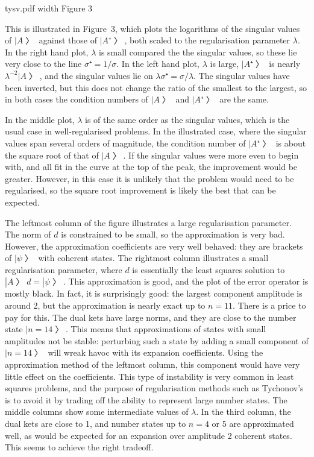 \midinsert \XeTeXpicfile tysv.pdf width \hsize
Figure 3 \endinsert

This is illustrated in Figure~3, which plots the logarithms of the singular values of $|A〉$ against those of $|A⁺〉$, both scaled to the regularisation parameter $λ$.  In the right hand plot, $λ$ is small compared the the singular values, so these lie very close to the line $σ⁺=1/σ$.  In the left hand plot, $λ$ is large, $|A⁺〉$ is nearly $λ^{-2}|A〉$, and the singular values lie on $λσ⁺=σ/λ$.  The singular values have been inverted, but this does not change the ratio of the smallest to the largest, so in both cases the condition numbers of $|A〉$ and $|A⁺〉$ are the same.

In the middle plot, $λ$ is of the same order as the singular values, which is the usual case in well-regularised problems.  In the illustrated case, where the singular values span several orders of magnitude, the condition number of $|A⁺〉$ is about the square root of that of $|A〉$.  If the singular values were more even to begin with, and all fit in the curve at the top of the peak, the improvement would be greater.  However, in this case it is unlikely that the problem would need to be regularised, so the square root improvement is likely the best that can be expected.

The leftmost column of the figure illustrates a large regularisation parameter.  The norm of $d$ is constrained to be small, so the approximation is very bad.  However, the approximation coefficients are very well behaved: they are brackets of $|ψ〉$ with coherent states.  The rightmost column illustrates a small regularisation parameter, where $d$ is essentially the least squares solution to $|A〉d=|ψ〉$.  This approximation is good, and the plot of the error operator is mostly black.  In fact, it is surprisingly good: the largest component amplitude is around 2, but the approximation is nearly exact up to $n=11$.  There is a price to pay for this.  The dual kets have large norms, and they are close to the number state $|n=14〉$.  This means that approximations of states with small amplitudes not be stable: perturbing such a state by adding a small component of $|n=14〉$ will wreak havoc with its expansion coefficients.  Using the approximation method of the leftmost column, this component would have very little effect on the coefficients.  This type of instability is very common in least squares problems, and the purpose of regularisation methods such as Tychonov's is to avoid it by trading off the ability to represent large number states.  The middle columns show some intermediate values of $λ$.  In the third column, the dual kets are close to 1, and number states up to $n=4$ or 5 are approximated well, as would be expected for an expansion over amplitude 2 coherent states.  This seems to achieve the right tradeoff.

